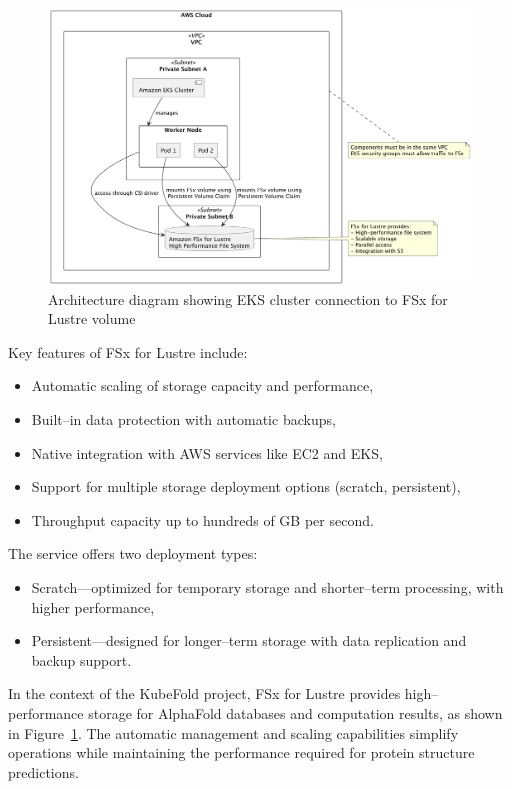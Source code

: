 \begin{figure}[htbp]
    \centering
    \includegraphics[width=\textwidth]{images/fsx}
    \caption{Architecture diagram showing EKS cluster connection to FSx for Lustre volume}
    \label{fig:fsx-architecture}
\end{figure}

Key features of FSx for Lustre include:
\begin{itemize}
    \item Automatic scaling of storage capacity and performance,
    \item Built--in data protection with automatic backups,
    \item Native integration with AWS services like EC2 and EKS,
    \item Support for multiple storage deployment options (scratch, persistent),
    \item Throughput capacity up to hundreds of GB per second.
\end{itemize}

The service offers two deployment types:
\begin{itemize}
    \item Scratch—optimized for temporary storage and shorter--term processing, with higher performance,
    \item Persistent—designed for longer--term storage with data replication and backup support.
\end{itemize}

In the context of the KubeFold project, FSx for Lustre provides high--performance storage for AlphaFold databases and computation results, as shown in Figure~\ref{fig:fsx-architecture}.
The automatic management and scaling capabilities simplify operations while maintaining the performance required for protein structure predictions.

